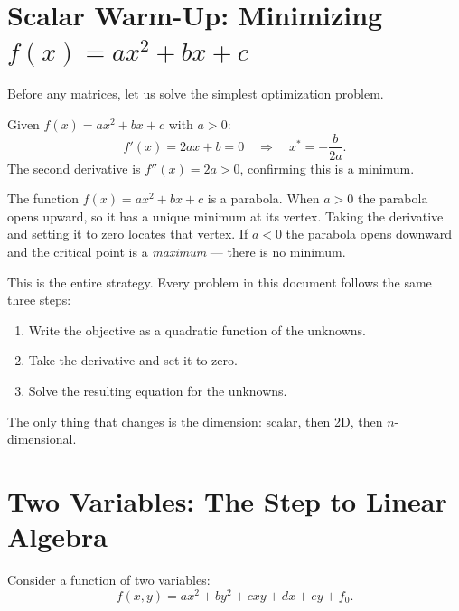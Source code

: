 \documentclass[11pt,a4paper]{article}
\begin{document}
\section{Scalar Warm-Up: Minimizing \texorpdfstring{$f(x) = ax^2 + bx + c$}{f(x) = ax² + bx + c}}

Before any matrices, let us solve the simplest optimization problem.

\begin{formaldef}
Given $f(x) = ax^2 + bx + c$ with $a > 0$:
\[
f'(x) = 2ax + b = 0 \quad \Longrightarrow \quad x^* = -\frac{b}{2a}.
\]
The second derivative is $f''(x) = 2a > 0$, confirming this is a minimum.
\end{formaldef}

\begin{intuition}
The function $f(x) = ax^2 + bx + c$ is a parabola. When $a > 0$ the parabola opens upward, so it has a unique minimum at its vertex. Taking the derivative and setting it to zero locates that vertex. If $a < 0$ the parabola opens downward and the critical point is a \emph{maximum} --- there is no minimum.
\end{intuition}

\begin{application}
This is the entire strategy. Every problem in this document follows the same three steps:
\begin{enumerate}[nosep]
\item Write the objective as a quadratic function of the unknowns.
\item Take the derivative and set it to zero.
\item Solve the resulting equation for the unknowns.
\end{enumerate}
The only thing that changes is the dimension: scalar, then 2D, then $n$-dimensional.
\end{application}

\section{Two Variables: The Step to Linear Algebra}

Consider a function of two variables:
\[
f(x,y) = ax^2 + by^2 + cxy + dx + ey + f_0.
\]
\end{document}
